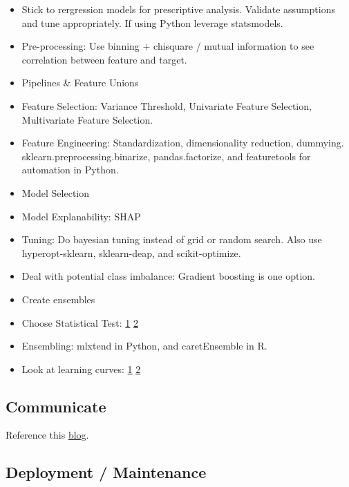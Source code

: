 \documentclass[]{book}
\theoremstyle{definition}
\theoremstyle{definition}
\theoremstyle{definition}
\theoremstyle{remark}
\begin{document}
\begin{itemize}
\item
  Stick to rergression models for prescriptive analysis. Validate
  assumptions and tune appropriately. If using Python leverage
  statsmodels.
\item
  Pre-processing: Use binning + chisquare / mutual information to see
  correlation between feature and target.
\item
  Pipelines \& Feature Unions
\item
  Feature Selection: Variance Threshold, Univariate Feature Selection,
  Multivariate Feature Selection.
\item
  Feature Engineering: Standardization, dimensionality reduction,
  dummying. sklearn.preprocessing.binarize, pandas.factorize, and
  featuretools for automation in Python.
\item
  Model Selection
\item
  Model Explanability: SHAP
\item
  Tuning: Do bayesian tuning instead of grid or random search. Also use
  hyperopt-sklearn, sklearn-deap, and scikit-optimize.
\item
  Deal with potential class imbalance: Gradient boosting is one option.
\item
  Create ensembles
\item
  Choose Statistical Test:
  \href{http://www.ats.ucla.edu/stat/mult_pkg/whatstat/}{1} \textbar{}
  \href{http://www.qnamarkup.org/i/?source=http://colarusso.github.io/QnAMarkup/examples/source/WhatStats.txt}{2}
\item
  Ensembling: mlxtend in Python, and caretEnsemble in R.
\item
  Look at learning curves:
  \href{https://www.dataquest.io/blog/learning-curves-machine-learning/}{1}
  \textbar{}
  \href{http://www.scikit-yb.org/en/latest/api/model_selection/learning_curve.html}{2}
\end{itemize}

\subsection{Communicate}\label{communicate}

Reference this
\href{https://www.dataquest.io/blog/data-science-project-style-guide/}{blog}.

\subsection{Deployment / Maintenance}\label{deployment-maintenance}
\end{document}
